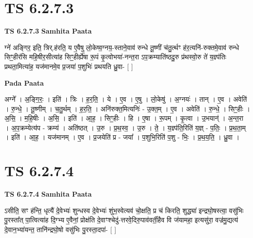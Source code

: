 \documentclass[17pt]{extarticle}
\begin{document}
\section*{ TS 6.2.7.3 }

\textbf{TS 6.2.7.3 } \newline
\textbf{Samhita Paata} \newline

ग्ने॑ अङ्गिर॒ इति॒ त्रिर्.ह॑रति॒ य ए॒वैषु लो॒केष्व॒ग्नय॒-स्ताने॒वाव॑ रुन्धे तू॒ष्णीं च॑तु॒र्त्थꣳ ह॑र॒त्यनि॑-रुक्तमे॒वाव॑ रुन्धे सिꣳ॒॒हीर॑सि महि॒षीर॒सीत्या॑ह सिꣳ॒॒हीर्ह्ये॑षा रू॒पं कृ॒त्वोभया॑-नन्त॒रा ऽप॒क्रम्याति॑ष्ठदु॒रु प्र॑थस्वो॒रु ते॑ य॒ज्ञ्प॑तिः प्रथता॒मित्या॑ह॒ यज॑मानमे॒व प्र॒जया॑ प॒शुभिः॑ प्रथयति ध्रु॒वा- [  ] \newline

\textbf{Pada Paata} \newline

अग्ने᳚ । अ॒ङ्गि॒रः॒ । इति॑ । त्रिः । ह॒र॒ति॒ । ये । ए॒व । ए॒षु । लो॒केषु॑ । अ॒ग्नयः॑ । तान् । ए॒व । अवेति॑ । रु॒न्धे॒ । तू॒ष्णीम् । च॒तु॒र्थम् । ह॒र॒ति॒ । अनि॑रुक्त॒मित्यनिः॑ - उ॒क्त॒म् । ए॒व । अवेति॑ । रु॒न्धे॒ । सिꣳ॒॒हीः । अ॒सि॒ । म॒हि॒षीः । अ॒सि॒ । इति॑ । आ॒ह॒ । सिꣳ॒॒हीः । हि । ए॒षा । रू॒पम् । कृ॒त्वा । उ॒भयान्॑ । अ॒न्त॒रा । अ॒प॒क्रम्येत्य॑प - क्रम्य॑ । अति॑ष्ठत् । उ॒रु । प्र॒थ॒स्व॒ । उ॒रु । ते॒ । य॒ज्ञ्प॑ति॒रिति॑ य॒ज्ञ् - प॒तिः॒ । प्र॒थ॒ता॒म् । इति॑ । आ॒ह॒ । यज॑मानम् । ए॒व । प्र॒जयेति॑ प्र - जया᳚ । प॒शुभि॒रिति॑ प॒शु - भिः॒ । प्र॒थ॒य॒ति॒ । ध्रु॒वा ।  \newline




\section*{ TS 6.2.7.4 }

\textbf{TS 6.2.7.4 } \newline
\textbf{Samhita Paata} \newline

ऽसीति॒ सꣳ ह॑न्ति॒ धृत्यै॑ दे॒वेभ्यः॑ शुन्धस्व दे॒वेभ्यः॑ शुंभ॒स्वेत्यव॑ चो॒क्षति॒ प्र च॑ किरति॒ शुद्ध्या॑ इन्द्रघो॒षस्त्वा॒ वसु॑भिः पु॒रस्ता᳚त् पा॒त्वित्या॑ह दि॒ग्भ्य ए॒वैनां॒ प्रोक्ष॑ति दे॒वाꣳश्चेदु॑-त्तरवे॒दिरु॒पाव॑वर्ती॒हैव वि ज॑यामहा॒ इत्यसु॑रा॒ वज्र॑मु॒द्यत्य॑ दे॒वान॒भ्या॑यन्त॒ तानि॑न्द्रघो॒षो वसु॑भिः पु॒रस्ता॒दपा॑- [  ] \newline
\end{document}
